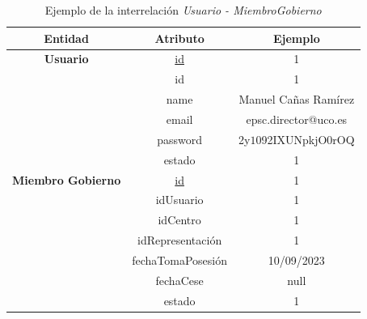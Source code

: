 \begin{itemize}
    \begin{table}[H]
    \centering
        \begin{tabular}{ | c | c | c |  }
             \hline
                 \textbf{Entidad} & \textbf{Atributo} & \textbf{Ejemplo}\\       
             \hline
                 \textbf{Usuario}  & \underline{id} & 1\\
                  & id & 1\\
                  & name & Manuel Cañas Ramírez\\
                  & email & epsc.director@uco.es\\
                  & password & 2y$10$92IXUNpkjO0rOQ\\
                  & estado & 1\\
              \hline
                  \textbf{Miembro Gobierno}  & \underline{id} & 1\\
                  & idUsuario & 1\\
                  & idCentro & 1\\
                  & idRepresentación & 1\\
                  & fechaTomaPosesión & 10/09/2023\\
                  & fechaCese & null\\
                  & estado & 1\\
        \end{tabular}
        \caption{Ejemplo de la interrelación \textit{Usuario - MiembroGobierno}}
        \label{table:I-Usu-MiGob}
    \end{table}
\end{itemize}

